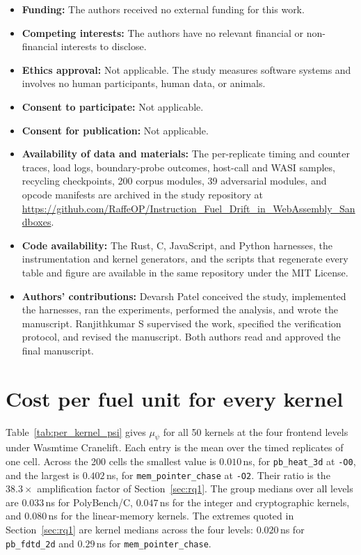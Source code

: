 \documentclass{ws-jcsc}
\begin{document}
\begin{itemize}
\item \textbf{Funding:} The authors received no external funding for this work.
\item \textbf{Competing interests:} The authors have no relevant financial or non-financial interests to disclose.
\item \textbf{Ethics approval:} Not applicable. The study measures software systems and involves no human participants, human data, or animals.
\item \textbf{Consent to participate:} Not applicable.
\item \textbf{Consent for publication:} Not applicable.
\item \textbf{Availability of data and materials:} The per-replicate timing and counter traces, load logs, boundary-probe outcomes, host-call and WASI samples, recycling checkpoints, 200 corpus modules, 39 adversarial modules, and opcode manifests are archived in the study repository at \url{https://github.com/RaffeOP/Instruction_Fuel_Drift_in_WebAssembly_Sandboxes}.
\item \textbf{Code availability:} The Rust, C, JavaScript, and Python harnesses, the instrumentation and kernel generators, and the scripts that regenerate every table and figure are available in the same repository under the MIT License.
\item \textbf{Authors' contributions:} Devarsh Patel conceived the study, implemented the harnesses, ran the experiments, performed the analysis, and wrote the manuscript. Ranjithkumar S supervised the work, specified the verification protocol, and revised the manuscript. Both authors read and approved the final manuscript.
\end{itemize}



\clearpage
\appendix

\section{Cost per fuel unit for every kernel}\label{app:kernels}
Table~\ref{tab:per_kernel_psi} gives $\mu_\psi$ for all 50 kernels at the four frontend levels under Wasmtime Cranelift. Each entry is the mean over the timed replicates of one cell. Across the 200 cells the smallest value is $0.010$\,ns, for \texttt{pb\_heat\_3d} at \texttt{-O0}, and the largest is $0.402$\,ns, for \texttt{mem\_pointer\_chase} at \texttt{-O2}. Their ratio is the $38.3\times$ amplification factor of Section~\ref{sec:rq1}. The group medians over all levels are $0.033$\,ns for PolyBench/C, $0.047$\,ns for the integer and cryptographic kernels, and $0.080$\,ns for the linear-memory kernels. The extremes quoted in Section~\ref{sec:rq1} are kernel medians across the four levels: $0.020$\,ns for \texttt{pb\_fdtd\_2d} and $0.29$\,ns for \texttt{mem\_pointer\_chase}.
\end{document}
